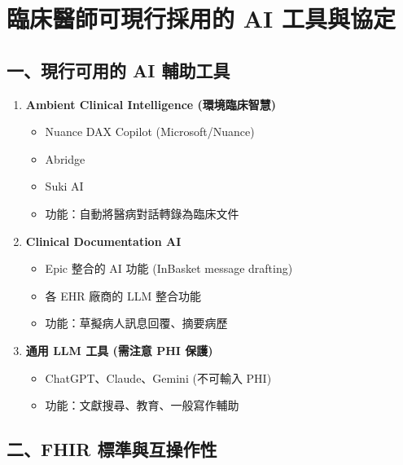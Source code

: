 \documentclass[12pt,a4paper]{article}
\begin{document}
\section{臨床醫師可現行採用的 AI 工具與協定}

\begin{tcolorbox}[colback=emergency_blue!5!white,colframe=emergency_blue,title=\textbf{實用工具與建議}]

\subsection*{一、現行可用的 AI 輔助工具}

\begin{enumerate}
    \item \textbf{Ambient Clinical Intelligence (環境臨床智慧)}
    \begin{itemize}
        \item Nuance DAX Copilot (Microsoft/Nuance)
        \item Abridge
        \item Suki AI
        \item 功能：自動將醫病對話轉錄為臨床文件
    \end{itemize}

    \item \textbf{Clinical Documentation AI}
    \begin{itemize}
        \item Epic 整合的 AI 功能 (InBasket message drafting)
        \item 各 EHR 廠商的 LLM 整合功能
        \item 功能：草擬病人訊息回覆、摘要病歷
    \end{itemize}

    \item \textbf{通用 LLM 工具 (需注意 PHI 保護)}
    \begin{itemize}
        \item ChatGPT、Claude、Gemini (不可輸入 PHI)
        \item 功能：文獻搜尋、教育、一般寫作輔助
    \end{itemize}
\end{enumerate}

\subsection*{二、FHIR 標準與互操作性}


\end{tcolorbox}
\end{document}
